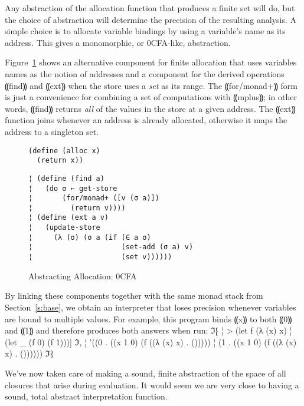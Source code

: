 Any abstraction of the allocation function that produces a finite set will do,
but the choice of abstraction will determine the precision of the resulting
analysis.  A simple choice is to allocate variable bindings by using a
variable's name as its address.  This gives a monomorphic, or 0CFA-like,
abstraction.

Figure~\ref{f:0cfa-abs} shows an alternative component for finite
allocation that uses variables names as the notion of addresses and a
component for the derived operations ⸨find⸩ and ⸨ext⸩
when the store uses a \emph{set} as its range.  The
⸨for/monad+⸩ form is just a convenience for combining a set of
computations with ⸨mplus⸩; in other words, ⸨find⸩
returns \emph{all} of the values in the store at a given address.  The
⸨ext⸩ function joins whenever an address is already allocated,
otherwise it maps the address to a singleton set.

\begin{figure}
\begin{lstlisting}
(define (alloc x)
  (return x))
\end{lstlisting}
\figskip{}
\begin{lstlisting}
¦ (define (find a)
¦   (do σ ← get-store
¦       (for/monad+ ([v (σ a)])
¦         (return v))))
¦ (define (ext a v)
¦   (update-store
¦     (λ (σ) (σ a (if (∈ a σ) 
¦                     (set-add (σ a) v) 
¦                     (set v))))))
\end{lstlisting}
\caption{Abstracting Allocation: 0CFA}
\label{f:0cfa-abs}
\end{figure}

By linking these components together with the same monad stack from
Section~\ref{s:base}, we obtain an interpreter that loses precision whenever
variables are bound to multiple values.  For example, this program
binds ⸨x⸩ to both ⸨0⸩ and ⸨1⸩ and therefore
produces both answers when run:
ℑ⁅
¦ > (let f (λ (x) x)
¦     (let _ (f 0) (f 1)))]
ℑ,
¦ '((0 . ((x 1 0) (f ((λ (x) x) . ()))))
¦   (1 . ((x 1 0) (f ((λ (x) x) . ())))))
ℑ⁆

We've now taken care of making a sound, finite abstraction of the
space of all closures that arise during evaluation.  It would seem we
are very close to having a sound, total abstract interpretation
function.

